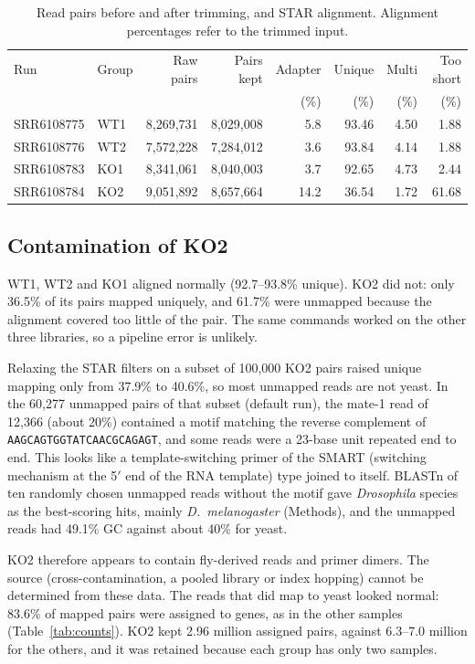 \documentclass[11pt, a4paper]{article}
\begin{document}
\begin{table}[tbp]
\centering
\caption{Read pairs before and after trimming, and STAR alignment. Alignment percentages refer to the trimmed input.}
\label{tab:trim}
\small
\begin{tabular}{llrrrrrr}
\toprule
Run & Group & Raw pairs & Pairs kept & Adapter & Unique & Multi & Too short \\
 & & & & (\%) & (\%) & (\%) & (\%) \\
\midrule
SRR6108775 & WT1 & 8,269,731 & 8,029,008 & 5.8 & 93.46 & 4.50 & 1.88 \\
SRR6108776 & WT2 & 7,572,228 & 7,284,012 & 3.6 & 93.84 & 4.14 & 1.88 \\
SRR6108783 & KO1 & 8,341,061 & 8,040,003 & 3.7 & 92.65 & 4.73 & 2.44 \\
SRR6108784 & KO2 & 9,051,892 & 8,657,664 & 14.2 & 36.54 & 1.72 & 61.68 \\
\bottomrule
\end{tabular}
\end{table}

\subsection{Contamination of KO2}\label{sec:contam}
WT1, WT2 and KO1 aligned normally (92.7--93.8\% unique). KO2 did not: only 36.5\% of its pairs mapped uniquely, and 61.7\% were unmapped because the alignment covered too little of the pair. The same commands worked on the other three libraries, so a pipeline error is unlikely.


Relaxing the STAR filters on a subset of 100,000 KO2 pairs raised unique mapping only from 37.9\% to 40.6\%, so most unmapped reads are not yeast. In the 60,277 unmapped pairs of that subset (default run), the mate-1 read of 12,366 (about 20\%) contained a motif matching the reverse complement of \texttt{AAGCAGTGGTATCAACGCAGAGT}, and some reads were a 23-base unit repeated end to end. This looks like a template-switching primer of the SMART (switching mechanism at the 5$'$ end of the RNA template) type joined to itself. BLASTn of ten randomly chosen unmapped reads without the motif gave \textit{Drosophila} species as the best-scoring hits, mainly \textit{D.~melanogaster} (Methods), and the unmapped reads had 49.1\% GC against about 40\% for yeast.

KO2 therefore appears to contain fly-derived reads and primer dimers. The source (cross-contamination, a pooled library or index hopping) cannot be determined from these data. The reads that did map to yeast looked normal: 83.6\% of mapped pairs were assigned to genes, as in the other samples (Table~\ref{tab:counts}). KO2 kept 2.96 million assigned pairs, against 6.3--7.0 million for the others, and it was retained because each group has only two samples.
\end{document}
